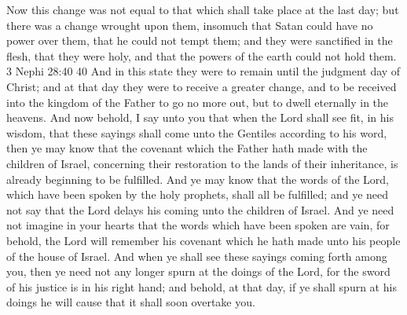Now this change was not equal to that which shall take place at the last day; but there was a change wrought upon them, insomuch that Satan could have no power over them, that he could not tempt them; and they were sanctified in the flesh, that they were holy, and that the powers of the earth could not hold them.  3 Nephi 28:40 40 And in this state they were to remain until the judgment day of Christ; and at that day they were to receive a greater change, and to be received into the kingdom of the Father to go no more out, but to dwell eternally in the heavens.
\bchapter
\bverse \iffalse And now behold, I say unto you that when the Lord shall see fit, in his wisdom, that these sayings shall come unto the Gentiles according to his word, then ye may know that the covenant which the Father hath made with the children of Israel, concerning their restoration to the lands of their inheritance, is already beginning to be fulfilled. \fi
And now behold, I say unto you that when the Lord shall see fit, in his wisdom, that these sayings shall come unto the Gentiles according to his word, then ye may know that the covenant which the Father hath made with the children of Israel, concerning their restoration to the lands of their inheritance, is already beginning to be fulfilled.
\bverse \iffalse And ye may know that the words of the Lord, which have been spoken by the holy prophets, shall all be fulfilled; and ye need not say that the Lord delays his coming unto the children of Israel. \fi
And ye may know that the words of the Lord, which have been spoken by the holy prophets, shall all be fulfilled; and ye need not say that the Lord delays his coming unto the children of Israel.
\bverse \iffalse And ye need not imagine in your hearts that the words which have been spoken are vain, for behold, the Lord will remember his covenant which he hath made unto his people of the house of Israel. \fi
And ye need not imagine in your hearts that the words which have been spoken are vain, for behold, the Lord will remember his covenant which he hath made unto his people of the house of Israel.
\bverse \iffalse And when ye shall see these sayings coming forth among you, then ye need not any longer spurn at the doings of the Lord, for the sword of his justice is in his right hand; and behold, at that day, if ye shall spurn at his doings he will cause that it shall soon overtake you. \fi
And when ye shall see these sayings coming forth among you, then ye need not any longer spurn at the doings of the Lord, for the sword of his justice is in his right hand; and behold, at that day, if ye shall spurn at his doings he will cause that it shall soon overtake you.
